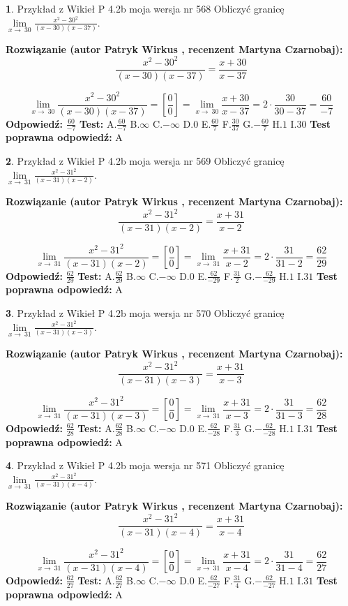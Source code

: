 \documentclass[12pt, a4paper]{article}
\theoremstyle{definition} %
\newtheorem{zad}{}
\newcommand{\zadStart}[1]{\begin{zad}#1\newline}
\newcommand{\zadStop}{\end{zad}}
\newcommand{\rozwStart}[2]{\noindent \textbf{Rozwiązanie (autor #1 , recenzent #2): }\newline}
\newcommand{\rozwStop}{\newline}
\newcommand{\odpStart}{\noindent \textbf{Odpowiedź:}\newline}
\newcommand{\odpStop}{\newline}
\newcommand{\testStart}{\noindent \textbf{Test:}\newline}
\newcommand{\testStop}{\newline}
\newcommand{\kluczStart}{\noindent \textbf{Test poprawna odpowiedź:}\newline}
\newcommand{\kluczStop}{\newline}
\begin{document}
\zadStart{Przykład z Wikieł P 4.2b moja wersja nr 568}
Obliczyć granicę $\lim\limits_{x\to\ 30}\frac{x^{2}-30^{2}}{(x-30)(x-37)}$.
\zadStop
\rozwStart{Patryk Wirkus}{Martyna Czarnobaj}
$$\frac{x^{2}-30^{2}}{(x-30)(x-37)}=\frac{x+30}{x-37}$$

$$\lim\limits_{x\to\ 30}\frac{x^{2}-30^{2}}{(x-30)(x-37)}=[\frac{0}{0}]=\lim\limits_{x\to\ 30}\frac{x+30}{x-37}=2 \cdot \frac{30}{30-37} = \frac{60}{-7}$$
\rozwStop
\odpStart
$\frac{60}{-7}$
\odpStop
\testStart
A.$\frac{60}{-7}$
B.$\infty$
C.$-\infty$
D.$0$
E.$\frac{60}{7}$
F.$\frac{30}{37}$
G.$-\frac{60}{7}$
H.$1$
I.$30$
\testStop
\kluczStart
A
\kluczStop



\zadStart{Przykład z Wikieł P 4.2b moja wersja nr 569}
Obliczyć granicę $\lim\limits_{x\to\ 31}\frac{x^{2}-31^{2}}{(x-31)(x-2)}$.
\zadStop
\rozwStart{Patryk Wirkus}{Martyna Czarnobaj}
$$\frac{x^{2}-31^{2}}{(x-31)(x-2)}=\frac{x+31}{x-2}$$

$$\lim\limits_{x\to\ 31}\frac{x^{2}-31^{2}}{(x-31)(x-2)}=[\frac{0}{0}]=\lim\limits_{x\to\ 31}\frac{x+31}{x-2}=2 \cdot \frac{31}{31-2} = \frac{62}{29}$$
\rozwStop
\odpStart
$\frac{62}{29}$
\odpStop
\testStart
A.$\frac{62}{29}$
B.$\infty$
C.$-\infty$
D.$0$
E.$\frac{62}{-29}$
F.$\frac{31}{2}$
G.$-\frac{62}{-29}$
H.$1$
I.$31$
\testStop
\kluczStart
A
\kluczStop



\zadStart{Przykład z Wikieł P 4.2b moja wersja nr 570}
Obliczyć granicę $\lim\limits_{x\to\ 31}\frac{x^{2}-31^{2}}{(x-31)(x-3)}$.
\zadStop
\rozwStart{Patryk Wirkus}{Martyna Czarnobaj}
$$\frac{x^{2}-31^{2}}{(x-31)(x-3)}=\frac{x+31}{x-3}$$

$$\lim\limits_{x\to\ 31}\frac{x^{2}-31^{2}}{(x-31)(x-3)}=[\frac{0}{0}]=\lim\limits_{x\to\ 31}\frac{x+31}{x-3}=2 \cdot \frac{31}{31-3} = \frac{62}{28}$$
\rozwStop
\odpStart
$\frac{62}{28}$
\odpStop
\testStart
A.$\frac{62}{28}$
B.$\infty$
C.$-\infty$
D.$0$
E.$\frac{62}{-28}$
F.$\frac{31}{3}$
G.$-\frac{62}{-28}$
H.$1$
I.$31$
\testStop
\kluczStart
A
\kluczStop



\zadStart{Przykład z Wikieł P 4.2b moja wersja nr 571}
Obliczyć granicę $\lim\limits_{x\to\ 31}\frac{x^{2}-31^{2}}{(x-31)(x-4)}$.
\zadStop
\rozwStart{Patryk Wirkus}{Martyna Czarnobaj}
$$\frac{x^{2}-31^{2}}{(x-31)(x-4)}=\frac{x+31}{x-4}$$

$$\lim\limits_{x\to\ 31}\frac{x^{2}-31^{2}}{(x-31)(x-4)}=[\frac{0}{0}]=\lim\limits_{x\to\ 31}\frac{x+31}{x-4}=2 \cdot \frac{31}{31-4} = \frac{62}{27}$$
\rozwStop
\odpStart
$\frac{62}{27}$
\odpStop
\testStart
A.$\frac{62}{27}$
B.$\infty$
C.$-\infty$
D.$0$
E.$\frac{62}{-27}$
F.$\frac{31}{4}$
G.$-\frac{62}{-27}$
H.$1$
I.$31$
\testStop
\kluczStart
A
\kluczStop
\end{document}
